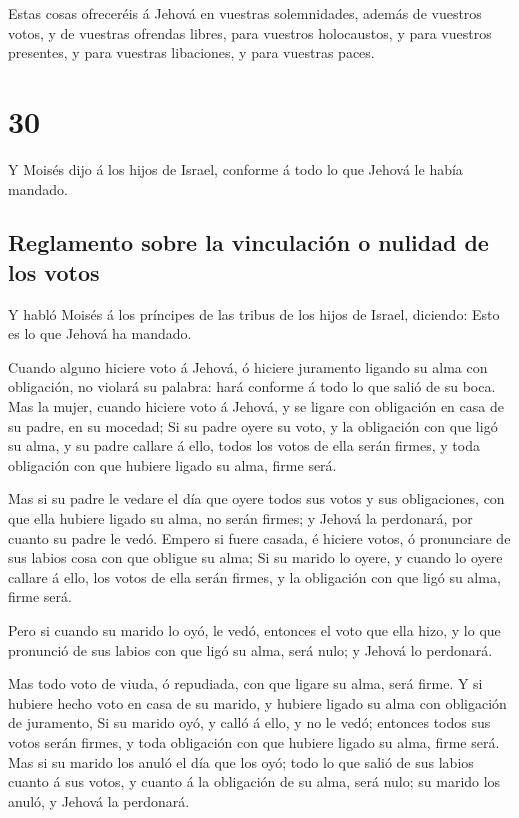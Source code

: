  Estas cosas ofreceréis á Jehová en vuestras
solemnidades, además de vuestros votos, y de vuestras ofrendas libres,
para vuestros holocaustos, y para vuestros presentes, y para vuestras
libaciones, y para vuestras paces.

\hypertarget{section-04-30}{%
\section{30}\label{section-04-30}}

 Y Moisés dijo á los hijos de Israel, conforme á todo lo
que Jehová le había mandado.

\hypertarget{reglamento-sobre-la-vinculaciuxf3n-o-nulidad-de-los-votos}{%
\subsection{Reglamento sobre la vinculación o nulidad de los
votos}\label{reglamento-sobre-la-vinculaciuxf3n-o-nulidad-de-los-votos}}

 Y habló Moisés á los príncipes de las tribus de los hijos
de Israel, diciendo: Esto es lo que Jehová ha mandado.

 Cuando alguno hiciere voto á Jehová, ó hiciere juramento
ligando su alma con obligación, no violará su palabra: hará conforme á
todo lo que salió de su boca.  Mas la mujer, cuando
hiciere voto á Jehová, y se ligare con obligación en casa de su padre,
en su mocedad;  Si su padre oyere su voto, y la obligación
con que ligó su alma, y su padre callare á ello, todos los votos de ella
serán firmes, y toda obligación con que hubiere ligado su alma, firme
será.

 Mas si su padre le vedare el día que oyere todos sus
votos y sus obligaciones, con que ella hubiere ligado su alma, no serán
firmes; y Jehová la perdonará, por cuanto su padre le vedó.
 Empero si fuere casada, é hiciere votos, ó pronunciare de
sus labios cosa con que obligue su alma;  Si su marido lo
oyere, y cuando lo oyere callare á ello, los votos de ella serán firmes,
y la obligación con que ligó su alma, firme será.

 Pero si cuando su marido lo oyó, le vedó, entonces el
voto que ella hizo, y lo que pronunció de sus labios con que ligó su
alma, será nulo; y Jehová lo perdonará.

 Mas todo voto de viuda, ó repudiada, con que ligare su
alma, será firme.  Y si hubiere hecho voto en casa de su
marido, y hubiere ligado su alma con obligación de juramento,
 Si su marido oyó, y calló á ello, y no le vedó; entonces
todos sus votos serán firmes, y toda obligación con que hubiere ligado
su alma, firme será.  Mas si su marido los anuló el día
que los oyó; todo lo que salió de sus labios cuanto á sus votos, y
cuanto á la obligación de su alma, será nulo; su marido los anuló, y
Jehová la perdonará.

